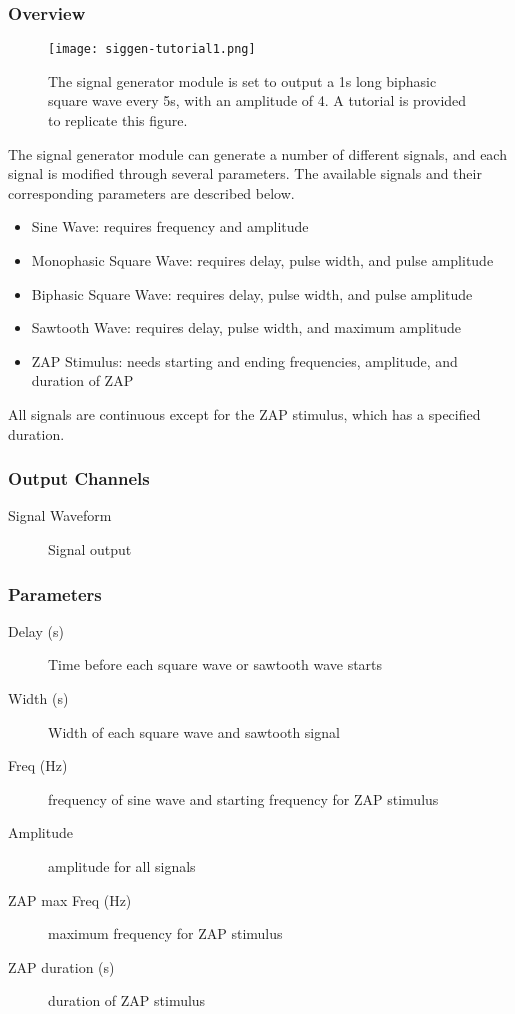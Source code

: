 
\subsubsection{Overview}
\label{Signal Generator}

\begin{figure}[h]
\begin{center}
\texttt{[image: siggen-tutorial1.png]} 
\caption[Signal Generator]{The signal generator module is set to output a 1s long biphasic square wave every 5s, with an amplitude of 4. A tutorial is provided to replicate this figure.}
\end{center}
\label{siggen1}
\end{figure}

The signal generator module can generate a number of different signals, and each signal is modified through several parameters. The available signals and their corresponding parameters are described below.

\begin{itemize}
\item Sine Wave: requires frequency and amplitude
\item Monophasic Square Wave: requires delay, pulse width, and pulse amplitude
\item Biphasic Square Wave: requires delay, pulse width, and pulse amplitude
\item Sawtooth Wave: requires delay, pulse width, and maximum amplitude
\item ZAP Stimulus: needs starting and ending frequencies, amplitude, and duration of ZAP
\end{itemize}

All signals are continuous except for the ZAP stimulus, which has a specified duration.

\subsubsection{Output Channels}
\begin{description}
\item [Signal Waveform]Signal output
\end{description}

\subsubsection{Parameters}
\begin{description}
\item [Delay (s)]Time before each square wave or sawtooth wave starts
\item [Width (s)]Width of each square wave and sawtooth signal
\item [Freq (Hz)]frequency of sine wave and starting frequency for ZAP stimulus
\item [Amplitude]amplitude for all signals
\item [ZAP max Freq (Hz)]maximum frequency for ZAP stimulus
\item [ZAP duration (s)]duration of ZAP stimulus
\end{description}

